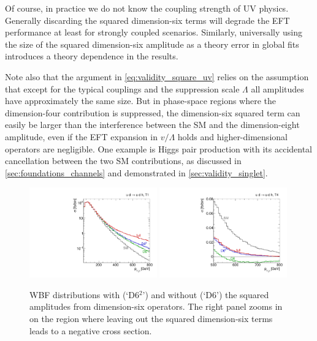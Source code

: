 Of course, in practice we do not know the coupling strength of UV
physics. Generally discarding the squared dimension-six terms will
degrade the EFT performance at least for strongly coupled
scenarios. Similarly, universally using the size of the squared
dimension-six amplitude as a theory error in global fits introduces a
theory dependence in the results.

Note also that the argument in \autoref{eq:validity_square_uv} relies
on the assumption that except for the typical couplings and the
suppression scale $\Lambda$ all amplitudes have approximately the same
size. But in phase-space regions where the dimension-four contribution
is suppressed, the dimension-six squared term can easily be larger
than the interference between the SM and the dimension-eight amplitude, even if
the EFT expansion in $v/\Lambda$ holds and higher-dimensional
operators are negligible. One example is Higgs pair production with
its accidental cancellation between the two SM contributions, as
discussed in \autoref{sec:foundations_channels} and demonstrated in
\ref{sec:validity_singlet}.

\begin{figure}
  \includegraphics[width=0.49\textwidth]{fig/validity/WBF_T1_j1pt.pdf}%
  \includegraphics[width=0.49\textwidth]{fig/validity/WBF_T4_j1pt_zoom.pdf}%
  \caption{WBF distributions with (`D6$^{2}$') and without (`D6')
    the squared amplitudes from dimension-six operators. The right
    panel zooms in on the region where leaving out the squared
    dimension-six terms leads to a negative cross section.}
  \label{fig:validity_squared}
\end{figure}

